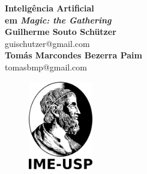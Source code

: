 \documentclass[dvipsnames]{book}
\begin{document}
  \begin{titlepage}
  \begin{center}
   {\huge\bfseries Inteligência Artificial \\ em \textit{Magic: the Gathering}\\}
   \vspace{1.5cm}
   {\bfseries Guilherme Souto Schützer}\\[5pt]
   guischutzer@gmail.com\\[14pt]
   \vspace{0.5cm}
   {\bfseries Tomás Marcondes Bezerra Paim}\\[5pt]
   tomasbmp@gmail.com\\[14pt]
   \vspace{2cm}
  {\begin{figure}[!h]
          \centering
              \includegraphics[width=0.25\textwidth]{picstcc/ime.png}
  \end{figure}}
   \vspace{0.4cm}
 \end{center}
  \end{titlepage}
\end{document}
